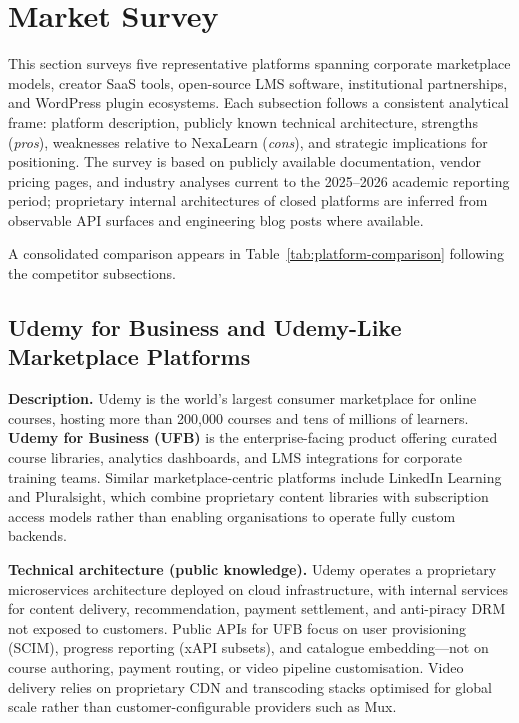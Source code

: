 
\section{Market Survey}
\label{sec:market-survey}

This section surveys five representative platforms spanning corporate marketplace models, creator SaaS tools, open-source LMS software, institutional partnerships, and WordPress plugin ecosystems. Each subsection follows a consistent analytical frame: platform description, publicly known technical architecture, strengths (\textit{pros}), weaknesses relative to NexaLearn (\textit{cons}), and strategic implications for positioning. The survey is based on publicly available documentation, vendor pricing pages, and industry analyses current to the 2025--2026 academic reporting period; proprietary internal architectures of closed platforms are inferred from observable API surfaces and engineering blog posts where available.

A consolidated comparison appears in Table~\ref{tab:platform-comparison} following the competitor subsections.

\subsection{Udemy for Business and Udemy-Like Marketplace Platforms}
\label{subsec:udemy}

\textbf{Description.}
Udemy is the world's largest consumer marketplace for online courses, hosting more than 200,000 courses and tens of millions of learners. \textbf{Udemy for Business (UFB)} is the enterprise-facing product offering curated course libraries, analytics dashboards, and LMS integrations for corporate training teams. Similar marketplace-centric platforms include LinkedIn Learning and Pluralsight, which combine proprietary content libraries with subscription access models rather than enabling organisations to operate fully custom backends.

\textbf{Technical architecture (public knowledge).}
Udemy operates a proprietary microservices architecture deployed on cloud infrastructure, with internal services for content delivery, recommendation, payment settlement, and anti-piracy DRM not exposed to customers. Public APIs for UFB focus on user provisioning (SCIM), progress reporting (xAPI subsets), and catalogue embedding---not on course authoring, payment routing, or video pipeline customisation. Video delivery relies on proprietary CDN and transcoding stacks optimised for global scale rather than customer-configurable providers such as Mux.


